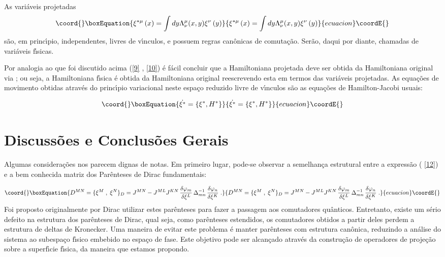 \documentclass[a4paper,thmsa,12pt]{report}
\begin{document}
As vari\'{a}veis projetadas 
\begin{equation}\coord{}\boxEquation{
\xi ^{*\mu }\left( x\right) =\int dy\Lambda _{\nu }^{\mu }(x,y)\xi ^{\nu
}\left( y\right)  \label{13}
}{
\xi ^{*\mu }\left( x\right) =\int dy\Lambda _{\nu }^{\mu }(x,y)\xi ^{\nu
}\left( y\right)  }{ecuacion}\coordE{}\end{equation}
s\~{a}o, em princ\'{\i}pio, independentes, livres de v\'{\i}nculos, e
possuem regras can\^{o}nicas de comuta\c{c}\~{a}o. Ser\~{a}o, daqui por
diante, chamadas de vari\'{a}veis f\'{\i}sicas.

Por analogia ao que foi discutido acima (\ref{9} , \ref{10}) \'{e} f\'{a}cil
concluir que a Hamiltoniana projetada deve ser obtida da Hamiltoniana
original via \coordHE{}; ou seja, a
Hamiltoniana f\'{\i}sica \'{e} obtida da Hamiltoniana original reescrevendo
esta em termos das vari\'{a}veis projetadas. As equa\c{c}\~{o}es de
movimento obtidas atrav\'{e}s do princ\'{\i}pio variacional neste espa\c{c}o
reduzido livre de v\'{\i}nculos s\~{a}o as equa\c{c}\~{o}es de
Hamilton-Jacobi usuais:

\begin{equation}\coord{}\boxEquation{
\dot{{\mathbf{\xi}^\ast}}=\left\{ \mathbf{\xi }^{\ast},H^{\ast}\right\}
\label{14}
}{
\dot{{\mathbf{\xi}^\ast}}=\left\{ \mathbf{\xi }^{\ast},H^{\ast}\right\}
}{ecuacion}\coordE{}\end{equation}

\section{{\sc Discuss\~oes e Conclus\~oes Gerais}}

Algumas considera\c{c}\~{o}es nos parecem dignas de notas. Em primeiro
lugar, pode-se observar a semelhan\c{c}a estrutural entre a express\~{a}o (%
\ref{12}) e a bem conhecida matriz dos Par\^{e}nteses de Dirac fundamentais:

\begin{equation}\coord{}\boxEquation{
D^{MN}=\{\xi ^{M}\;,\;\xi ^{N}\}_{D}=J^{MN}-J^{ML}J^{KN}\,\frac{\delta
\varphi _{m}}{\delta \xi ^{L}}\,\Delta _{mn}^{-1}\,\frac{\delta \varphi _{n}
}{\delta \xi ^{K}}\;.  \label{m10}
}{
D^{MN}=\{\xi ^{M}\;,\;\xi ^{N}\}_{D}=J^{MN}-J^{ML}J^{KN}\,\frac{\delta
\varphi _{m}}{\delta \xi ^{L}}\,\Delta _{mn}^{-1}\,\frac{\delta \varphi _{n}
}{\delta \xi ^{K}}\;.  }{ecuacion}\coordE{}\end{equation}
Foi proposto originalmente por Dirac utilizar estes par\^{e}nteses para
fazer a passagem aos comutadores qu\^{a}nticos. Entretanto, existe um
s\'{e}rio defeito na estrutura dos par\^{e}nteses de Dirac, qual seja, como
par\^{e}nteses estendidos, os comutadores obtidos a partir deles perdem a
estrutura de deltas de Kronecker. Uma maneira de evitar este problema \'{e}
manter par\^{e}nteses com estrutura can\^{o}nica, reduzindo a an\'{a}lise do
sistema ao subespa\c{c}o f\'{\i}sico embebido no espa\c{c}o de fase. Este
objetivo pode ser alcan\c{c}ado atrav\'{e}s da constru\c{c}\~{a}o de
operadores de proje\c{c}\~{a}o sobre a superf\'{\i}cie f\'{\i}sica, da
maneira que estamos propondo.
\end{document}
